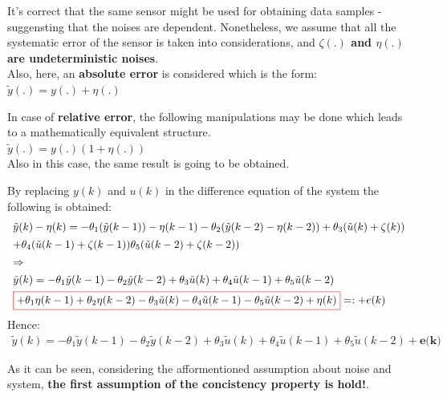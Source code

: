 \begin{factbox}
It's correct that the same sensor might be used for obtaining data samples - suggensting that the noises are dependent. Nonetheless, we assume that all the systematic error of the sensor is taken into considerations, and \textbf{\(\zeta(.)\) and \(\eta(.)\) are undeterministic noises}.\\

Also, here, an \textbf{absolute error} is considered which is the form:\\
\(\tilde{y}(.) = y(.) + \eta(.)\)
\end{factbox}
\newpage
\begin{factbox}
In case of \textbf{relative error}, the following manipulations may be done which leads to a mathematically equivalent structure.\\
\(\tilde{y}(.) = y(.)(1 + \eta(.))\)\\
Also in this case, the same result is going to be obtained.
\end{factbox}
By replacing \(y(k)\) and \(u(k)\) in the difference equation of the system the following is obtained:
\[
\begin{array}{l}
\tilde{y}(k) - \eta(k) = -\theta_1(\tilde{y}(k-1)) - \eta(k-1) -\theta_2(\tilde{y}(k-2) - \eta(k-2)) + \theta_3(\tilde{u}(k) + \zeta(k)) \\[1ex] 
+ \theta_4(\tilde{u}(k-1) + \zeta(k-1))
 \theta_5(\tilde{u}(k-2) + \zeta(k-2)) \\[1ex] 
\Rightarrow \\[1ex]
\tilde{y}(k)= -\theta_1 \tilde{y}(k - 1) - \theta_2 \tilde{y}(k - 2) + \theta_3 \tilde{u}(k) + \theta_4 \tilde{u}(k - 1) + \theta_5 \tilde{u}(k - 2) \\[1ex]
\textcolor{red}{\fbox{\textcolor{black}{$+ \theta_1\eta(k-1) + \theta_2\eta(k-2) - \theta_3\tilde{u}(k) - \theta_4\tilde{u}(k-1) - \theta_5\tilde{u}(k-2) + \eta(k) $}}} =: + e(k) \\
\end{array}
\]
Hence:
\begin{equation}
\begin{array}{l}
\tilde{y}(k)= -\theta_1 \tilde{y}(k - 1) - \theta_2 \tilde{y}(k - 2) + \theta_3 \tilde{u}(k) + \theta_4 \tilde{u}(k - 1) + \theta_5 \tilde{u}(k - 2) + \textbf{e(k)}
\end{array}
\end{equation}

As it can be seen, considering the afformentioned assumption about noise and system, \textbf{the first assumption of the concistency property is hold!}.\\


